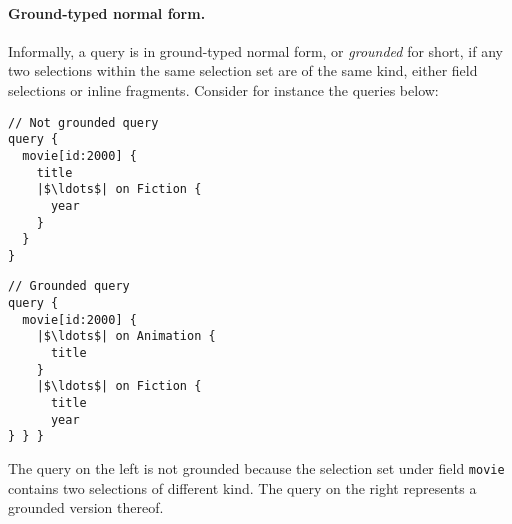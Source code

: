 
\paragraph{Ground-typed normal form.}
Informally, a query is in ground-typed normal form, or {\em grounded}
for short, if %
any two selections within the same selection set are of the same kind,
either field selections or inline fragments. 
Consider for instance the queries below:

\smallskip

\begin{minipage}[t]{.25\textwidth}
\begin{verbatim}
// Not grounded query
query {
  movie[id:2000] {
    title
    |$\ldots$| on Fiction {
	  year
    }
  }
}
\end{verbatim}
\end{minipage}%
\begin{minipage}[t]{.25\textwidth}
\begin{verbatim}
// Grounded query
query {
  movie[id:2000] {
    |$\ldots$| on Animation {
      title
    }
    |$\ldots$| on Fiction {
      title
      year
} } }
\end{verbatim} 
\end{minipage}

\medskip

\noindent The query on the left is not grounded because the selection
set under field \texttt{movie} contains two selections of different
kind. The query on the right represents a grounded version thereof. %

